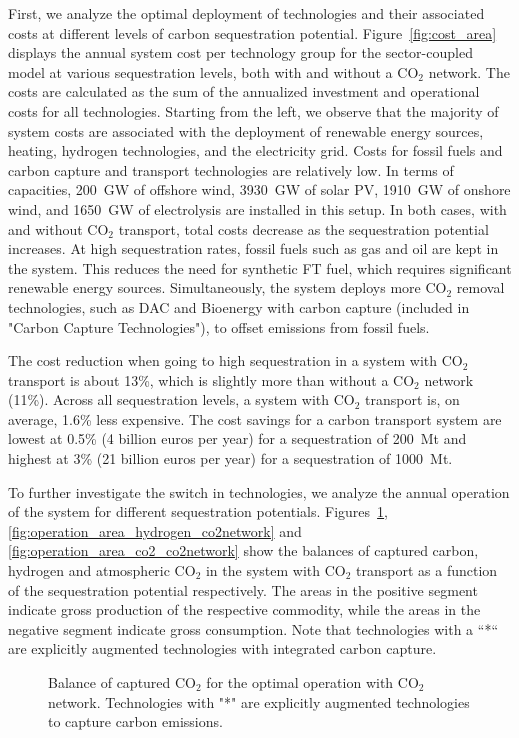 \documentclass[twocolumn]{article}
\newcommand{\carbon}{CO$_2$}
\begin{document}
First, we analyze the optimal deployment of technologies and their associated costs at different levels of carbon sequestration potential. Figure~\ref{fig:cost_area} displays the annual system cost per technology group for the sector-coupled model at various sequestration levels, both with and without a \carbon{} network. The costs are calculated as the sum of the annualized investment and operational costs for all technologies. Starting from the left, we observe that the majority of system costs are associated with the deployment of renewable energy sources, heating, hydrogen technologies, and the electricity grid. Costs for fossil fuels and carbon capture and transport technologies are relatively low. In terms of capacities, 200~GW of offshore wind, 3930~GW of solar PV, 1910~GW of onshore wind, and 1650~GW of electrolysis are installed in this setup.
In both cases, with and without \carbon{} transport, total costs decrease as the sequestration potential increases. At high sequestration rates, fossil fuels such as gas and oil are kept in the system. This reduces the need for synthetic FT fuel, which requires significant renewable energy sources. Simultaneously, the system deploys more \carbon{} removal technologies, such as DAC and Bioenergy with carbon capture (included in "Carbon Capture Technologies"), to offset emissions from fossil fuels.

The cost reduction when going to high sequestration in a system with \carbon{} transport is about 13\%, which is slightly more than without a \carbon{} network (11\%). Across all sequestration levels, a system with \carbon{} transport is, on average, 1.6\% less expensive. The cost savings for a carbon transport system are lowest at 0.5\% (4 billion euros per year) for a sequestration of 200~Mt and highest at 3\% (21 billion euros per year) for a sequestration of 1000~Mt.


To further investigate the switch in technologies, we analyze the annual operation of the system for different sequestration potentials. Figures~\ref{fig:operation_area_carbon_co2network}, \ref{fig:operation_area_hydrogen_co2network} and \ref{fig:operation_area_co2_co2network} show the balances of captured carbon, hydrogen and atmospheric \carbon{} in the system with \carbon{} transport as a function of the sequestration potential respectively. The areas in the positive segment indicate gross production of the respective commodity, while the areas in the negative segment indicate gross consumption.
Note that technologies with a ``*`` are explicitly augmented technologies with integrated carbon capture.
%
\begin{figure}[h]
    \centering
    \caption{Balance of captured \carbon{} for the optimal operation with \carbon{} network. Technologies with "*" are explicitly augmented technologies to capture carbon emissions.}
    \label{fig:operation_area_carbon_co2network}
\end{figure}
\end{document}
